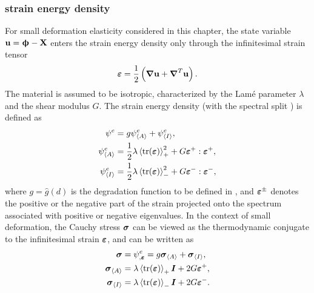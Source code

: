 \subsubsection{strain energy density}

For small deformation elasticity considered in this chapter, the state variable $\textbf{u} = \boldsymbol{\upphi} - \textbf{X}$ enters the strain energy density only through the infinitesimal strain tensor
\begin{align}
  \boldsymbol{\varepsilon} = \dfrac{1}{2}\left( \boldsymbol{\nabla} \textbf{u} + \boldsymbol{\nabla}^T \textbf{u} \right).
\end{align}
The material is assumed to be isotropic, characterized by the Lam\'{e} parameter $\lambda$ and the shear modulus $G$. The strain energy density (with the spectral split \cite{miehe_2010_p1, miehe_2010_p2}) is defined as
\begin{subequations}
  \begin{align}
    \psi^e               & = g \psi^e_{\left< A \right>} + \psi^e_{\left< I \right>},                              \label{eq: chapter 3 strain energy density} \\
    \psi^e_{\left< A \right>}   & = \dfrac{1}{2} \lambda \left<\operatorname{tr}(\boldsymbol{\varepsilon})\right>_+^2 + G \boldsymbol{\varepsilon}^+:\boldsymbol{\varepsilon}^+,                                             \\
    \psi^e_{\left< I \right>} & = \dfrac{1}{2} \lambda \left<\operatorname{tr}(\boldsymbol{\varepsilon})\right>_-^2 + G \boldsymbol{\varepsilon}^-:\boldsymbol{\varepsilon}^-,                                             
  \end{align}
\end{subequations}
where $g = \hat{g}(d)$ is the degradation function to be defined in , and $\boldsymbol{\varepsilon}^\pm$ denotes the positive or the negative part of the strain projected onto the spectrum associated with positive or negative eigenvalues. In the context of small deformation, the Cauchy stress $\boldsymbol{\sigma}$ can be viewed as the thermodynamic conjugate to the infinitesimal strain $\boldsymbol{\varepsilon}$, and can be written as
\begin{subequations}
  \begin{align}
    \boldsymbol{\sigma}               & = \psi^e_{,\boldsymbol{\varepsilon}} = g \boldsymbol{\sigma}_{\left< A \right>} + \boldsymbol{\sigma}_{\left< I \right>}, \label{eq: chapter 3 stress strain relation} \\
    \boldsymbol{\sigma}_{\left< A \right>}   & = \lambda \left<\operatorname{tr}(\boldsymbol{\varepsilon})\right>_+ \boldsymbol{I} + 2 G \boldsymbol{\varepsilon}^+,                                                         \\
    \boldsymbol{\sigma}_{\left< I \right>} & = \lambda \left<\operatorname{tr}(\boldsymbol{\varepsilon})\right>_- \boldsymbol{I} + 2 G \boldsymbol{\varepsilon}^-.                                                         
  \end{align}
\end{subequations}


